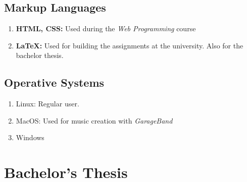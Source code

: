 \documentclass[letterpaper]{twentysecondcv-eng} %
\begin{document}
\subsection{Markup Languages}
\begin{enumerate}
	\item \textbf{HTML, CSS:} Used during the  {\it Web Programming} course
	\item \textbf{\LaTeX:} Used for building the assignments at the university. Also for the bachelor thesis.
\end{enumerate}

\subsection{Operative Systems}
\begin{enumerate}
	\item Linux: Regular user.
	\item MacOS: Used for music creation with  {\it GarageBand}
	\item Windows
\end{enumerate}



\newpage %

\makeprofile %

\section{Bachelor's Thesis}
\end{document}
